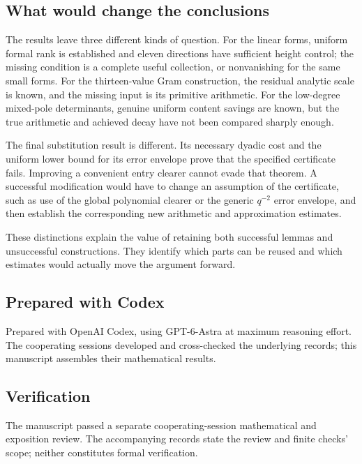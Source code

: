 \subsection{What would change the conclusions}
The results leave three different kinds of question.
For the linear forms, uniform formal rank is established and eleven
directions have sufficient height control; the missing condition is a
complete useful collection, or nonvanishing for the same small forms.
For the thirteen-value Gram construction, the residual analytic scale
is known, and the missing input is its primitive arithmetic.
For the low-degree mixed-pole determinants, genuine uniform content
savings are known, but the true arithmetic and achieved decay have not
been compared sharply enough.

The final substitution result is different. Its necessary dyadic cost
and the uniform lower bound for its error envelope prove that the
specified certificate fails. Improving a convenient entry clearer
cannot evade that theorem. A successful modification would have to
change an assumption of the certificate, such as use of the global
polynomial clearer or the generic $q^{-2}$ error envelope, and then
establish the corresponding new arithmetic and approximation estimates.

These distinctions explain the value of retaining both successful
lemmas and unsuccessful constructions. They identify which parts can
be reused and which estimates would actually move the argument forward.

\subsection{Prepared with Codex}
Prepared with OpenAI Codex, using GPT-6-Astra at maximum reasoning effort.
The cooperating sessions developed and cross-checked the underlying
records; this manuscript assembles their mathematical results.

\subsection{Verification}
The manuscript passed a separate cooperating-session mathematical and
exposition review. The accompanying records state the review and finite
checks' scope; neither constitutes formal verification.
